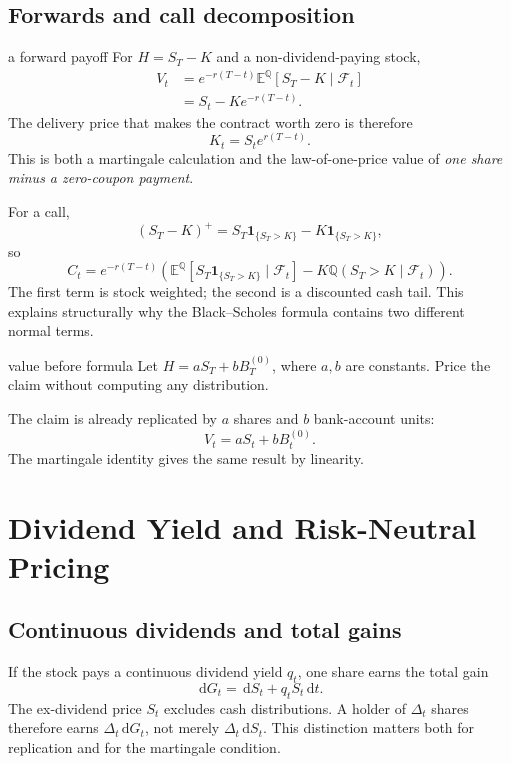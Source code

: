 \documentclass[10pt]{article}
\newcommand{\E}{\mathbb E}
\newcommand{\Q}{\mathbb Q}
\newcommand{\1}{\mathbf 1}
\newcommand{\cF}{\mathcal F}
\newcommand{\dd}{\,\mathrm d}
\theoremstyle{definition}
\begin{document}
\subsection{Forwards and call decomposition}

\begin{boardexample}{a forward payoff}
For \(H=S_T-K\) and a non-dividend-paying stock,
\[
\begin{aligned}
V_t
&=e^{-r(T-t)}\E^\Q[S_T-K\mid\cF_t]\\
&=S_t-Ke^{-r(T-t)}.
\end{aligned}
\]
The delivery price that makes the contract worth zero is therefore
\[
\boxed{K_t=S_te^{r(T-t)}.}
\]
This is both a martingale calculation and the law-of-one-price value of
\emph{one share minus a zero-coupon payment}.
\end{boardexample}

For a call,
\[
(S_T-K)^+=S_T\1_{\{S_T>K\}}-K\1_{\{S_T>K\}},
\]
so
\[
C_t=e^{-r(T-t)}
\left(
\E^\Q[S_T\1_{\{S_T>K\}}\mid\cF_t]
-K\Q(S_T>K\mid\cF_t)
\right).
\]
The first term is stock weighted; the second is a discounted cash tail. This
explains structurally why the Black--Scholes formula contains two different
normal terms.

\begin{studentexercise}{value before formula}
Let \(H=aS_T+bB_T^{(0)}\), where \(a,b\) are constants. Price the claim without
computing any distribution.
\end{studentexercise}
\begin{shortsolution}
The claim is already replicated by \(a\) shares and \(b\) bank-account units:
\[
\boxed{V_t=aS_t+bB_t^{(0)}.}
\]
The martingale identity gives the same result by linearity.
\end{shortsolution}

\section{Dividend Yield and Risk-Neutral Pricing}

\subsection{Continuous dividends and total gains}

If the stock pays a continuous dividend yield \(q_t\), one share earns the
total gain
\[
\boxed{\dd G_t=\dd S_t+q_tS_t\dd t.}
\]
The ex-dividend price \(S_t\) excludes cash distributions. A holder of
\(\Delta_t\) shares therefore earns \(\Delta_t\dd G_t\), not merely
\(\Delta_t\dd S_t\). This distinction matters both for replication and for
the martingale condition.
\end{document}
